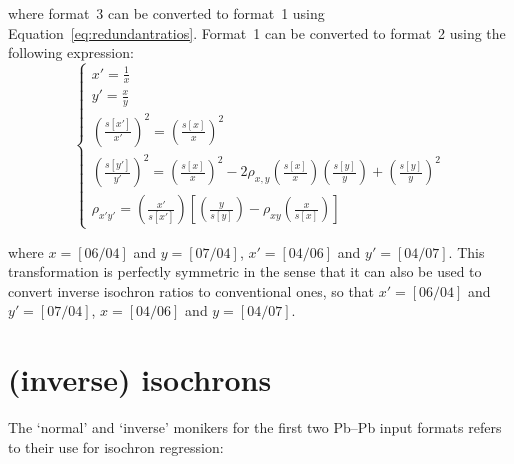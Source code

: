 \begin{refsection}
\noindent where format~3 can be converted to format~1 using
Equation~\ref{eq:redundantratios}. Format~1 can be converted to
format~2 using the following expression:
\begin{equation}
  \begin{cases}
    x' = \frac{1}{x} \\
    y' = \frac{x}{y} \\
    \left(\frac{s[x']}{x'}\right)^2 = 
    \left(\frac{s[x]}{x}\right)^2 \\
    \left(\frac{s[y']}{y'}\right)^2 =
    \left(\frac{s[x]}{x}\right)^2 -
    2 \rho_{x,y}\left(\frac{s[x]}{x}\right)\left(\frac{s[y]}{y}\right) +
    \left(\frac{s[y]}{y}\right)^2 \\
    \rho_{x'y'} =
    \left(\frac{x'}{s[x']}\right)
    \left[
    \left(\frac{y}{s[y]}\right) -
    \rho_{xy}\left(\frac{x}{s[x]}\right)
    \right]
  \end{cases}
  \label{eq:format12transformation}
\end{equation}

\noindent where $x=[06/04]$ and $y=[07/04]$, $x'=[04/06]$ and
$y'=[04/07]$. This transformation is perfectly symmetric in the sense
that it can also be used to convert inverse isochron ratios to
conventional ones, so that $x'=[06/04]$ and $y'=[07/04]$, $x=[04/06]$
and $y=[04/07]$.

\section{(inverse) isochrons}\label{sec:inverseIsochrons}

The `normal' and `inverse' monikers for the first two Pb--Pb input
formats refers to their use for isochron regression:


\end{refsection}
